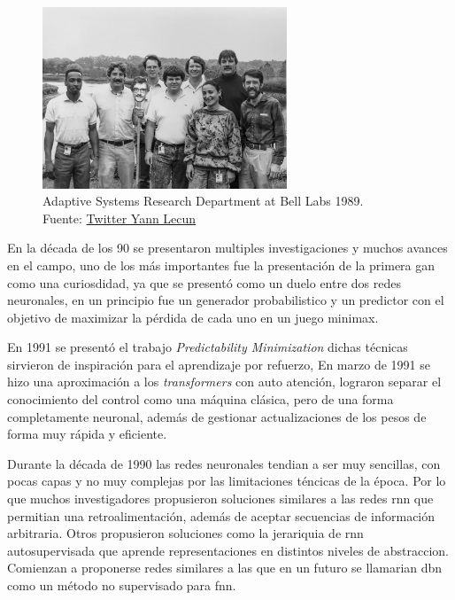 \begin{figure}[H]
  \centering
  \includegraphics[width=0.65\textwidth]{figures/yann-lecun - EyIwmEDW8AIQs1C.jpeg}
  \caption{Adaptive Systems Research Department at Bell Labs 1989. \\Fuente: \href{https://twitter.com/ylecun/status/1378718317695934465}{Twitter Yann Lecun}}
  \label{fig:adaptive-systems-research-department-at-bell-labs}
\end{figure}


En la década de los 90 se presentaron multiples investigaciones y muchos avances en el campo, uno de los más importantes fue la presentación de la primera \acrshort{gan} como una curiosdidad, ya que se presentó como un duelo entre dos redes neuronales, en un principio fue un generador probabilistico y un predictor con el objetivo de maximizar la pérdida de cada uno en un juego minimax.

En 1991 se presentó el trabajo \textit{Predictability Minimization} \cite{urgen1991learning} dichas técnicas sirvieron de inspiración para el aprendizaje por refuerzo,
En marzo de 1991 se hizo una aproximación a los \textit{transformers} con auto atención, lograron separar el conocimiento del control como una máquina clásica, pero de una forma completamente neuronal, además de gestionar actualizaciones de los pesos de forma muy rápida y eficiente.

Durante la década de 1990 las redes neuronales tendian a ser muy sencillas, con pocas capas y no muy complejas por las limitaciones téncicas de la época.
Por lo que muchos investigadores propusieron soluciones similares a las redes \acrshort{rnn} que permitian una retroalimentación, además de aceptar secuencias de información arbitraria.
Otros propusieron soluciones como la jerariquia de \acrshort{rnn} autosupervisada que aprende representaciones en distintos niveles de abstraccion.
Comienzan a proponerse redes similares a las que en un futuro se llamarian \acrshort{dbn} como un método no supervisado para \acrshort{fnn}.

